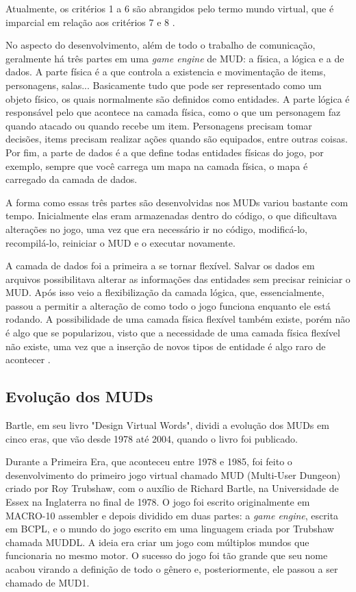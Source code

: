 Atualmente, os critérios 1 a 6 são abrangidos pelo termo mundo virtual, que é imparcial em relação aos critérios 7 e 8 \cite{bartle2015multi}.

No aspecto do desenvolvimento, além de todo o trabalho de comunicação, geralmente há três partes em uma 
\textit{game engine} de MUD: a física, a lógica e a de dados. A parte física é a que controla a existencia 
e movimentação de items, personagens, salas... Basicamente tudo que pode ser representado como um objeto 
físico, os quais normalmente são definidos como entidades. A parte lógica é responsável pelo que acontece 
na camada física, como o que um personagem faz quando atacado ou quando recebe um item. Personagens precisam 
tomar decisões, items precisam realizar ações quando são equipados, entre outras coisas. Por fim, a parte 
de dados é a que define todas entidades físicas do jogo, por exemplo, sempre que você carrega um mapa na 
camada física, o mapa é carregado da camada de dados.

A forma como essas três partes são desenvolvidas nos MUDs variou bastante com tempo. Inicialmente 
elas eram armazenadas dentro do código, o que dificultava alterações no jogo, uma vez que era necessário 
ir no código, modificá-lo, recompilá-lo, reiniciar o MUD e o executar novamente.

A camada de dados foi a primeira a se tornar flexível. Salvar os dados em arquivos possibilitava 
alterar as informações das entidades sem precisar reiniciar o MUD. Após isso veio a flexibilização 
da camada lógica, que, essencialmente, passou a permitir a alteração de como todo o jogo funciona 
enquanto ele está rodando. A possibilidade de uma camada física flexível também existe, porém não é 
algo que se popularizou, visto que a necessidade de uma camada física flexível não existe, uma vez 
que a inserção de novos tipos de entidade é algo raro de acontecer \cite{penton2003mud}.

\subsection{Evolução dos MUDs}

Bartle, em seu livro "Design Virtual Words", dividi a evolução dos MUDs em cinco eras, 
que vão desde 1978 até 2004, quando o livro foi publicado.

Durante a Primeira Era, que aconteceu entre 1978 e 1985, foi feito o desenvolvimento do primeiro jogo 
virtual chamado MUD (Multi-User Dungeon) criado por Roy Trubshaw, com o auxílio de Richard Bartle, 
na Universidade de Essex na Inglaterra no final de 1978. O jogo foi escrito originalmente em MACRO-10 
assembler e depois dividido em duas partes: a \textit{game engine}, escrita em BCPL, e o mundo do jogo escrito 
em uma linguagem criada por Trubshaw chamada MUDDL. A ideia era criar um jogo com múltiplos mundos 
que funcionaria no mesmo motor. O sucesso do jogo foi tão grande que seu nome acabou virando a definição 
de todo o gênero e, posteriormente, ele passou a ser chamado de MUD1.

